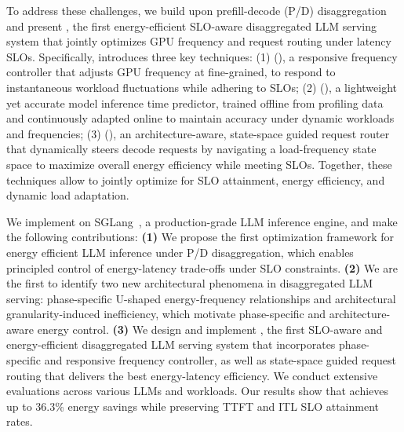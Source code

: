 To address these challenges, we build upon prefill-decode (P/D) disaggregation~\cite{patel2024splitwise,zhong2024distserve} and present \name, 
the first energy-efficient SLO-aware disaggregated LLM serving system that jointly optimizes GPU frequency and request routing under latency SLOs.
Specifically, \name introduces three key techniques:
(1) \governor (), a responsive frequency controller that adjusts GPU frequency at fine-grained,  to respond to instantaneous workload fluctuations while adhering to SLOs;
(2) \predictor (), a lightweight yet accurate model inference time predictor, trained offline from profiling data and continuously adapted online to maintain accuracy under dynamic workloads and frequencies;
(3) \router (), an architecture-aware, state-space guided request router that dynamically steers decode requests by navigating a load-frequency state space to maximize overall energy efficiency while meeting SLOs.
Together, these techniques allow \name to jointly optimize for SLO attainment, energy efficiency, and dynamic load adaptation.

We implement \name on SGLang~\cite{zheng2024sglang}, a production-grade LLM inference engine, and make the following contributions:
\textbf{(1)} We propose the first optimization framework for energy efficient LLM inference under P/D disaggregation, which enables principled control of energy-latency trade-offs under SLO constraints.
\textbf{(2)} We are the first to identify two new architectural phenomena in disaggregated LLM serving: phase-specific U-shaped energy-frequency relationships and architectural granularity-induced inefficiency, which motivate phase-specific and architecture-aware energy control.
\textbf{(3)} We design and implement \name, the first SLO-aware and energy-efficient disaggregated LLM serving system that incorporates phase-specific and responsive frequency controller, as well as state-space guided request routing that delivers the best energy-latency efficiency.
We conduct extensive evaluations across various LLMs and workloads.
Our results show that \name achieves up to 36.3\% energy savings while preserving TTFT and ITL SLO attainment rates.




